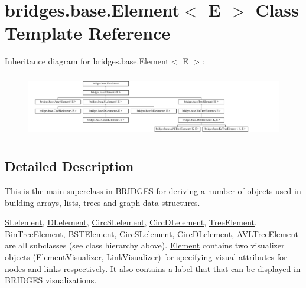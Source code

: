\hypertarget{classbridges_1_1base_1_1_element}{}\section{bridges.\+base.\+Element$<$ E $>$ Class Template Reference}
\label{classbridges_1_1base_1_1_element}
Inheritance diagram for bridges.\+base.\+Element$<$ E $>$\+:\begin{figure}[H]
\begin{center}
\leavevmode
\includegraphics[height=2.788382cm]{classbridges_1_1base_1_1_element}
\end{center}
\end{figure}


\subsection{Detailed Description}
This is the main superclass in B\+R\+I\+D\+G\+ES for deriving a number of objects used in building arrays, lists, trees and graph data structures. 

\hyperlink{classbridges_1_1base_1_1_s_lelement}{S\+Lelement}, \hyperlink{classbridges_1_1base_1_1_d_lelement}{D\+Lelement}, \hyperlink{classbridges_1_1base_1_1_circ_s_lelement}{Circ\+S\+Lelement}, \hyperlink{classbridges_1_1base_1_1_circ_d_lelement}{Circ\+D\+Lelement}, \hyperlink{classbridges_1_1base_1_1_tree_element}{Tree\+Element}, \hyperlink{classbridges_1_1base_1_1_bin_tree_element}{Bin\+Tree\+Element}, \hyperlink{classbridges_1_1base_1_1_b_s_t_element}{B\+S\+T\+Element}, \hyperlink{classbridges_1_1base_1_1_circ_s_lelement}{Circ\+S\+Lelement}, \hyperlink{classbridges_1_1base_1_1_circ_d_lelement}{Circ\+D\+Lelement}, \hyperlink{classbridges_1_1base_1_1_a_v_l_tree_element}{A\+V\+L\+Tree\+Element} are all subclasses (see class hierarchy above). \hyperlink{classbridges_1_1base_1_1_element}{Element} contains two visualizer objects (\hyperlink{classbridges_1_1base_1_1_element_visualizer}{Element\+Visualizer}, \hyperlink{classbridges_1_1base_1_1_link_visualizer}{Link\+Visualizer}) for specifying visual attributes for nodes and links respectively. It also contains a label that that can be displayed in B\+R\+I\+D\+G\+ES visualizations.

